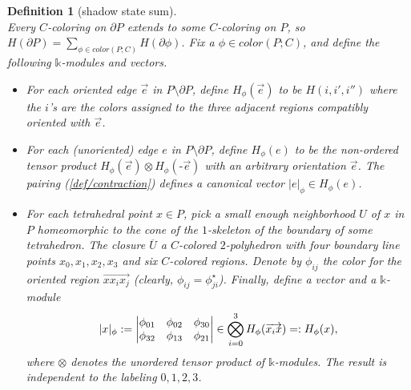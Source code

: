 \documentclass[12pt]{extarticle}
\numberwithin{equation}{section} %
\theoremstyle{mystyle}
\newtheorem{definition}[equation]{Definition}
\newcommand{\details}[1]{
    {\color{OliveGreen} #1} \\}
\begin{document}
\begin{definition}[shadow state sum]\label{def/shadow-state-sum}\details{\cite[section X.1.2]{turaev-qiok-3-manifolds}}
  Every $C$-coloring on $\partial P$ extends to some $C$-coloring
  on $P$, so
  $H(\partial P) = \sum_{\phi \in color(P; C)} H(\partial \phi)$.
  Fix a $\phi \in color(P; C)$, and define the following
  $\mathbb{k}$-modules and vectors.
\begin{itemize}
  \item For each oriented edge $\vec{e}$ in
        $P \setminus \partial P$, define $H_{\phi}(\vec{e})$ to
        be $H(i,i',i'')$ where the $i$'s are the colors assigned
        to the three adjacent regions compatibly oriented with
        $\vec{e}$.
  \item For each (unoriented) edge $e$ in
        $P \setminus \partial P$, define $H_{\phi}(e)$ to be the
        non-ordered tensor product
        $H_{\phi}(\vec{e}) \otimes H_{\phi}(\text{-}\vec{e})$
        with an arbitrary orientation $\vec{e}$. The pairing
        (\ref{def/contraction}) defines a canonical vector
        $|e|_{\phi} \in H_{\phi}(e)$.
  \item For each tetrahedral point $x \in P$, pick a small enough
        neighborhood $U$ of $x$ in $P$ homeomorphic to the cone
        of the $1$-skeleton of the boundary of some tetrahedron.
        The closure $\overline{U}$ a $C$-colored $2$-polyhedron
        with four boundary line points
        $x_{0}, x_{1}, x_{2}, x_{3}$ and six $C$-colored regions.
        Denote by $\phi_{ij}$ the color for the oriented region
        $\overrightarrow{xx_{i}x_{j}}$ (clearly,
        $\phi_{ij} = \phi_{ji}^{\star}$). Finally, define a
        vector and a $\mathbb{k}$-module
        $$|x|_{\phi} := \begin{vmatrix} \phi_{01} & \phi_{02} & \phi_{30} \\ \phi_{32} & \phi_{13} & \phi_{21} \\ \end{vmatrix} \in \bigotimes_{i=0}^{3} H_{\phi}(\overrightarrow{x_{i}x}) =: H_{\phi}(x),$$
        where $\otimes$ denotes the unordered tensor product of
        $\mathbb{k}$-modules. The result is independent to the
        labeling $0, 1, 2, 3$.
\end{itemize}


\end{definition}
\end{document}
